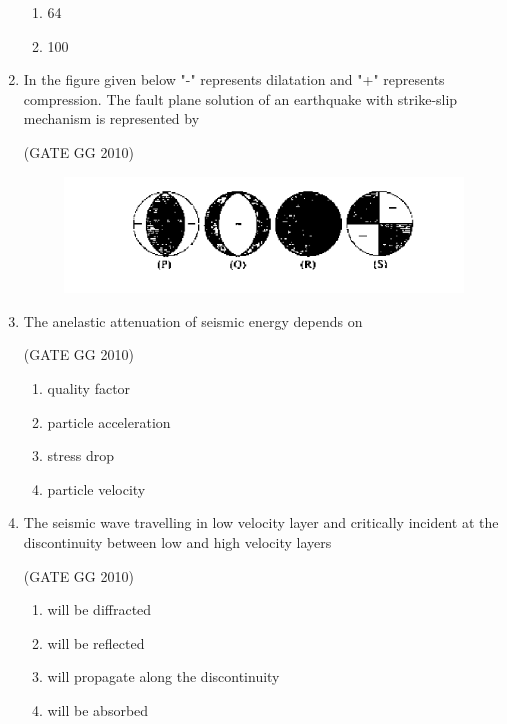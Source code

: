 \documentclass[journal]{IEEEtran}
\begin{document}
\begin{enumerate}[start=26]
\begin{enumerate}
\item 64

\item 100
\end{enumerate}

\item In the figure given below "-" represents dilatation and "+" represents compression. The fault plane solution of an earthquake with strike-slip mechanism is represented by

\hfill{(GATE GG 2010)}

\begin{figure}[H]
    \centering
    \includegraphics[width=0.5\linewidth]{figs/Screenshot from 2025-08-07 18-03-55.png} 
    \caption{}
    \label{fig:}
\end{figure}
\begin{enumerate}
\end{enumerate}

\item  The anelastic attenuation of seismic energy depends on

\hfill{(GATE GG 2010)}

\begin{enumerate}
    \item  quality factor
\item  particle acceleration
\item stress drop
\item  particle velocity
\end{enumerate}
 \item The seismic wave travelling in low velocity layer and critically incident at the discontinuity between low and high velocity layers
 
 \hfill{(GATE GG 2010)}
 
\begin{enumerate}
    \item  will be diffracted
\item  will be reflected
\item  will propagate along the discontinuity
\item will be absorbed
\end{enumerate}


\end{enumerate}
\end{document}
